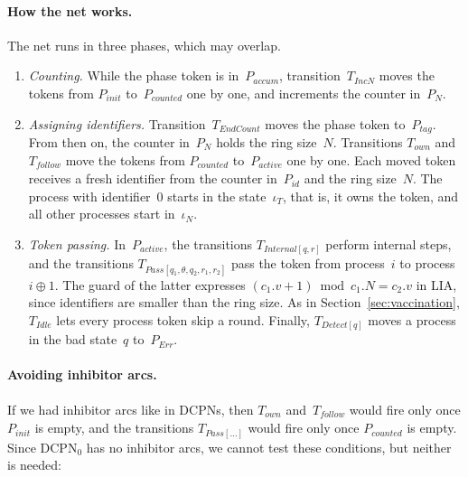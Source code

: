 \documentclass[11pt]{article}
\theoremstyle{definition}
\newcommand{\DCPN}[1]{\texorpdfstring{\textup{DCPN}\ensuremath{_{#1}}}{DCPN#1}}
\begin{document}
\paragraph{How the net works.}
The net runs in three phases, which may overlap.
\begin{enumerate}
  \item \emph{Counting.} While the phase token is in~$P_{\mathit{accum}}$,
    transition~$T_{\mathit{IncN}}$ moves the tokens from $P_{\mathit{init}}$
    to~$P_{\mathit{counted}}$ one by one, and increments the counter in~$P_N$.
  \item \emph{Assigning identifiers.} Transition~$T_{\mathit{EndCount}}$
    moves the phase token to~$P_{\mathit{tag}}$. From then on, the counter
    in~$P_N$ holds the ring size~$N$. Transitions $T_{\mathit{own}}$
    and~$T_{\mathit{follow}}$ move the tokens from $P_{\mathit{counted}}$
    to~$P_{\mathit{active}}$ one by one. Each moved token receives a fresh
    identifier from the counter in~$P_{\mathit{id}}$ and the ring size~$N$.
    The process with identifier~$0$ starts in the state~$\iota_T$, that is,
    it owns the token, and all other processes start in~$\iota_N$.
  \item \emph{Token passing.} In~$P_{\mathit{active}}$, the transitions
    $T_{\mathit{Internal}[q, r]}$ perform internal steps, and the transitions
    $T_{\mathit{Pass}[q_1, \theta, q_2, r_1, r_2]}$ pass the token from
    process~$i$ to process~$i \oplus 1$. The guard of the latter expresses
    $(c_1.v + 1) \bmod c_1.N = c_2.v$ in LIA, since identifiers are smaller than
    the ring size. As in Section~\ref{sec:vaccination}, $T_{\mathit{Idle}}$
    lets every process token skip a round. Finally, $T_{\mathit{Detect}[q]}$
    moves a process in the bad state~$q$ to~$P_{\mathit{Err}}$.
\end{enumerate}

\paragraph{Avoiding inhibitor arcs.}

If we had inhibitor arcs like in DCPNs, then $T_{\mathit{own}}$
and~$T_{\mathit{follow}}$ would fire only once $P_{\mathit{init}}$ is empty,
and the transitions $T_{\mathit{Pass}[\dots]}$ would fire only once
$P_{\mathit{counted}}$ is empty. Since \DCPN{0} has no inhibitor arcs, we
cannot test these conditions, but neither is needed:
\end{document}
